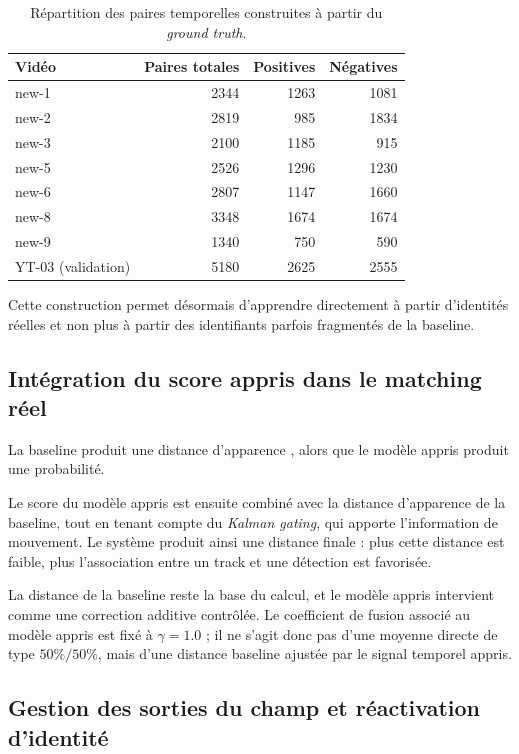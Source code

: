 \documentclass[11pt,a4paper]{article}
\begin{document}
\begin{table}[H]
\centering
\begin{tabular}{l r r r}
\toprule
\textbf{Vidéo} & \textbf{Paires totales} & \textbf{Positives} & \textbf{Négatives} \\
\midrule
new-1 & 2344 & 1263 & 1081 \\
new-2 & 2819 & 985 & 1834 \\
new-3 & 2100 & 1185 & 915 \\
new-5 & 2526 & 1296 & 1230 \\
new-6 & 2807 & 1147 & 1660 \\
new-8 & 3348 & 1674 & 1674 \\
new-9 & 1340 & 750 & 590 \\
\midrule
YT-03 (validation) & 5180 & 2625 & 2555 \\
\bottomrule
\end{tabular}
\caption{Répartition des paires temporelles construites à partir du \textit{ground truth}.}
\end{table}

Cette construction permet désormais d'apprendre directement à partir d'identités réelles et non plus à partir des identifiants parfois fragmentés de la baseline.

\subsection{Intégration du score appris dans le matching réel}

La baseline produit une distance d'apparence , alors que le modèle appris produit une probabilité. 

Le score du modèle appris est ensuite combiné avec la distance d'apparence de la baseline, tout en tenant compte du \textit{Kalman gating}, qui apporte l'information de mouvement. Le système produit ainsi une distance finale : plus cette distance est faible, plus l'association entre un track et une détection est favorisée.

La distance de la baseline reste la base du calcul, et le modèle appris intervient comme une correction additive contrôlée. Le coefficient de fusion associé au modèle appris est fixé à \(\gamma = 1.0\) ; il ne s'agit donc pas d'une moyenne directe de type \(50\% / 50\%\), mais d'une distance baseline ajustée par le signal temporel appris.

\subsection{Gestion des sorties du champ et réactivation d'identité}
\end{document}
